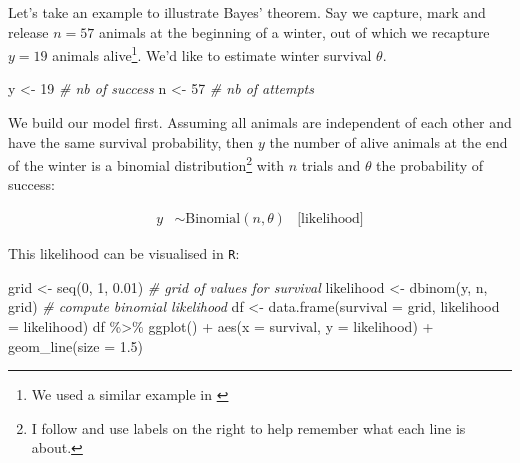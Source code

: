 \documentclass[
  12pt,
]{krantz}
\newenvironment{Shaded}{\begin{snugshade}}{\end{snugshade}}
\newcommand{\AttributeTok}[1]{\textcolor[rgb]{0.77,0.63,0.00}{#1}}
\newcommand{\CommentTok}[1]{\textcolor[rgb]{0.56,0.35,0.01}{\textit{#1}}}
\newcommand{\DecValTok}[1]{\textcolor[rgb]{0.00,0.00,0.81}{#1}}
\newcommand{\FloatTok}[1]{\textcolor[rgb]{0.00,0.00,0.81}{#1}}
\newcommand{\FunctionTok}[1]{\textcolor[rgb]{0.00,0.00,0.00}{#1}}
\newcommand{\NormalTok}[1]{#1}
\newcommand{\OtherTok}[1]{\textcolor[rgb]{0.56,0.35,0.01}{#1}}
\newcommand{\SpecialCharTok}[1]{\textcolor[rgb]{0.00,0.00,0.00}{#1}}
\begin{document}
Let's take an example to illustrate Bayes' theorem. Say we capture, mark and release \(n = 57\) animals at the beginning of a winter, out of which we recapture \(y = 19\) animals alive\footnote{We used a similar example in \citet{king_bayesian_2009}}. We'd like to estimate winter survival \(\theta\).

\begin{Shaded}
\begin{Highlighting}[]
\NormalTok{y }\OtherTok{\textless{}{-}} \DecValTok{19} \CommentTok{\# nb of success}
\NormalTok{n }\OtherTok{\textless{}{-}} \DecValTok{57} \CommentTok{\# nb of attempts}
\end{Highlighting}
\end{Shaded}

We build our model first. Assuming all animals are independent of each other and have the same survival probability, then \(y\) the number of alive animals at the end of the winter is a binomial distribution\footnote{I follow \citet{mcelreathbook} and use labels on the right to help remember what each line is about.} with \(n\) trials and \(\theta\) the probability of success:

\begin{align*}
y &\sim \text{Binomial}(n, \theta) &\text{[likelihood]}
\end{align*}

This likelihood can be visualised in \texttt{R}:

\begin{Shaded}
\begin{Highlighting}[]
\NormalTok{grid }\OtherTok{\textless{}{-}} \FunctionTok{seq}\NormalTok{(}\DecValTok{0}\NormalTok{, }\DecValTok{1}\NormalTok{, }\FloatTok{0.01}\NormalTok{) }\CommentTok{\# grid of values for survival}
\NormalTok{likelihood }\OtherTok{\textless{}{-}} \FunctionTok{dbinom}\NormalTok{(y, n, grid) }\CommentTok{\# compute binomial likelihood}
\NormalTok{df }\OtherTok{\textless{}{-}} \FunctionTok{data.frame}\NormalTok{(}\AttributeTok{survival =}\NormalTok{ grid, }\AttributeTok{likelihood =}\NormalTok{ likelihood) }
\NormalTok{df }\SpecialCharTok{\%\textgreater{}\%}
  \FunctionTok{ggplot}\NormalTok{() }\SpecialCharTok{+} 
  \FunctionTok{aes}\NormalTok{(}\AttributeTok{x =}\NormalTok{ survival, }\AttributeTok{y =}\NormalTok{ likelihood) }\SpecialCharTok{+} 
  \FunctionTok{geom\_line}\NormalTok{(}\AttributeTok{size =} \FloatTok{1.5}\NormalTok{)}
\end{Highlighting}
\end{Shaded}
\end{document}
